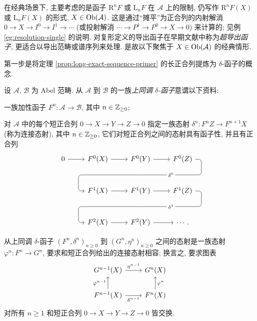 在经典场景下, 主要考虑的是函子 $\mathrm{R}^n F$ 或 $\mathrm{L}_n F$ 在 $\mathcal{A}$ 上的限制, 仍写作 $\mathrm{R}^n F(X)$ 或 $\mathrm{L}_n F(X)$ 的形式, $X \in \operatorname{Ob}(\mathcal{A})$. 这是通过``摊平''为正合列的内射解消 $0 \to X \to I^0 \to I^1 \to \cdots$ (或投射解消 $\cdots \to P^1 \to P^0 \to X \to 0$) 来计算的; 见例 \ref{eg:resolution-single} 的说明. 对复形定义的导出函子在早期文献中称为\emph{超导出函子}, 更适合以导出范畴或谱序列来处理. 是故以下聚焦于 $X \in \operatorname{Ob}(\mathcal{A})$ 的经典情形.

第一步是将定理 \ref{prop:long-exact-sequence-primer} 的长正合列提炼为 $\delta$-函子的概念.

\begin{definition}\label{def:delta-functor}
	设 $\mathcal{A}$, $\mathcal{B}$ 为 Abel 范畴. 从 $\mathcal{A}$ 到 $\mathcal{B}$ 的一族\emph{上同调 $\delta$-函子}意谓以下资料:
	\begin{compactitem}
		\item 一族加性函子 $F^n: \mathcal{A} \to \mathcal{B}$, 其中 $n \in \mathbb{Z}_{\geq 0}$;
		\item 对 $\mathcal{A}$ 中的每个短正合列 $0 \to X \to Y \to Z \to 0$ 指定一族态射 $\delta^n: F^n Z \to F^{n+1} X$ (称为连接态射), 其中 $n \in \mathbb{Z}_{\geq 0}$, 它们对短正合列之间的态射具有函子性, 并且有正合列
		\begin{equation*}\begin{tikzcd}[row sep=large]
			0 \arrow[r] & F^0(X) \arrow[r] & F^0(Y) \arrow[r] \arrow[phantom, d, ""{coordinate, name=A}] & F^0(Z) \arrow[dll, rounded corners, "{\delta^0}" description, to path={
				-- ([xshift=2ex]\tikztostart.east)
				|- (A) [near end]\tikztonodes
				-| ([xshift=-2ex]\tikztotarget.west)
				-- (\tikztotarget)}] \\
			& F^1(X) \arrow[r] & F^1(Y) \arrow[r] \arrow[phantom, d, ""{coordinate, name=B}] & F^1(Z) \arrow[dll, rounded corners, "{\delta^1}" description, to path={
				-- ([xshift=2ex]\tikztostart.east)
				|- (B) [near end]\tikztonodes
				-| ([xshift=-2ex]\tikztotarget.west)
				-- (\tikztotarget)}] \\
			& F^2(X) \arrow[r] & F^2(Y) \arrow[r] & \cdots .
		\end{tikzcd}\end{equation*}
	\end{compactitem}
	从上同调 $\delta$-函子 $(F^n, \delta^n)_{n \geq 0}$ 到 $(G^n, \eta^n)_{n \geq 0}$ 之间的态射是一族态射 $\varphi^n: F^n \to G^n$, 要求和短正合列给出的连接态射相容; 换言之, 要求图表
	\[\begin{tikzcd}
		G^{n-1} (X) \arrow[r, "{\eta^{n-1}}"] & G^n (X) \\
		F^{n-1} (X) \arrow[r, "{\delta^{n-1}}"'] \arrow[u, "{\varphi^{n-1}}"] & F^n (X) \arrow[u, "\varphi^n"']
	\end{tikzcd}\]
	对所有 $n \geq 1$ 和短正合列 $0 \to X \to Y \to Z \to 0$ 皆交换.
	

\end{definition}
